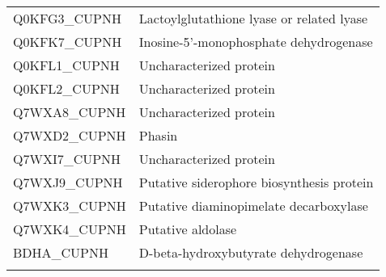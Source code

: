\begin{center}
\begin{longtable}{ l l }
Q0KFG3\_CUPNH & Lactoylglutathione lyase or related lyase \\ [0.5ex]
Q0KFK7\_CUPNH & Inosine-5'-monophosphate dehydrogenase \\ [0.5ex]
Q0KFL1\_CUPNH & Uncharacterized protein \\ [0.5ex]
Q0KFL2\_CUPNH & Uncharacterized protein \\ [0.5ex]
Q7WXA8\_CUPNH & Uncharacterized protein \\ [0.5ex]
Q7WXD2\_CUPNH & Phasin \\ [0.5ex]
Q7WXI7\_CUPNH & Uncharacterized protein \\ [0.5ex]
Q7WXJ9\_CUPNH & Putative siderophore biosynthesis protein \\ [0.5ex]
Q7WXK3\_CUPNH & Putative diaminopimelate decarboxylase \\ [0.5ex]
Q7WXK4\_CUPNH & Putative aldolase \\ [0.5ex]
BDHA\_CUPNH & D-beta-hydroxybutyrate dehydrogenase \\ [0.5ex] \bottomrule
\label{table:ralstonia-proteins}
\end{longtable}
\end{center}
